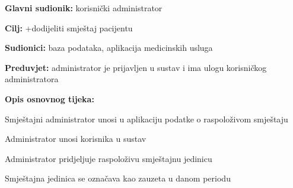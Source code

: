                         \noindent {}
					\begin{packed_item}
	
						\item \textbf{Glavni sudionik: }korisnički administrator
						\item  \textbf{Cilj:} +dodijeliti smještaj pacijentu
						\item  \textbf{Sudionici:} baza podataka, aplikacija medicinskih usluga
						\item  \textbf{Preduvjet:} administrator je prijavljen u sustav i ima ulogu korisničkog administratora
						\item  \textbf{Opis osnovnog tijeka:}
						
						\item[] \begin{packed_enum}
	
							\item Smještajni administrator unosi u aplikaciju podatke o raspoloživom smještaju
                                \item Administrator unosi korisnika u sustav
                                \item Administrator pridjeljuje raspoloživu smještajnu jedinicu
                                \item Smještajna jedinica se označava kao zauzeta u danom periodu
						\end{packed_enum}
						
					\end{packed_item}

                       

